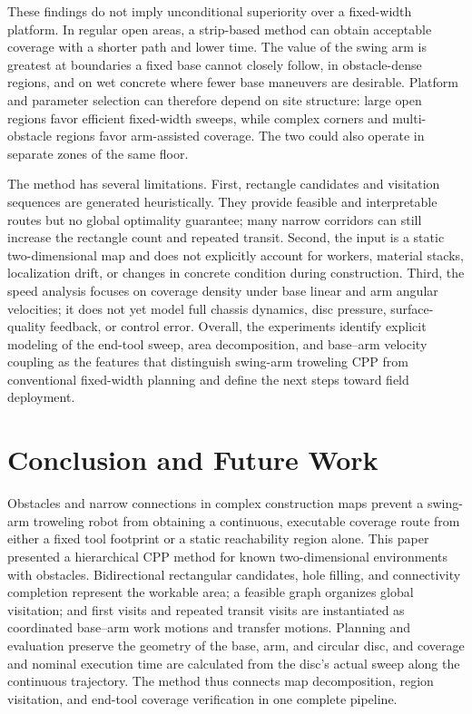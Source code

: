 \documentclass[a4paper,11pt]{article}
\providecommand{\DIFaddtex}[1]{{\protect\color{blue}#1}} %
\providecommand{\DIFaddbegin}{} %
\providecommand{\DIFaddend}{} %
\providecommand{\DIFadd}[1]{\texorpdfstring{\DIFaddtex{#1}}{#1}} %
\begin{document}
These findings do not imply unconditional superiority over a fixed-width platform. In regular open areas, a strip-based method can obtain acceptable coverage with a shorter path and lower time. The value of the swing arm is greatest at boundaries a fixed base cannot closely follow, in obstacle-dense regions, and on wet concrete where fewer base maneuvers are desirable. Platform and parameter selection can therefore depend on site structure: large open regions favor efficient fixed-width sweeps, while complex corners and multi-obstacle regions favor arm-assisted coverage. The two could also operate in separate zones of the same floor.

The method has several limitations. First, rectangle candidates and visitation sequences are generated heuristically. They provide feasible and interpretable routes but no global optimality guarantee; many narrow corridors can still increase the rectangle count and repeated transit. Second, the input is a static two-dimensional map and does not explicitly account for workers, material stacks, localization drift, or changes in concrete condition during construction. Third, the speed analysis focuses on coverage density under base linear and arm angular velocities; it does not yet model full chassis dynamics, disc pressure, surface-quality feedback, or control error. Overall, the experiments identify explicit modeling of the end-tool sweep, area decomposition, and \DIFaddbegin \DIFadd{base--arm }\DIFaddend velocity coupling as the features that distinguish swing-arm troweling CPP from conventional fixed-width planning and define the next steps toward field deployment.

\section{Conclusion and Future Work}
\label{sec:conclusion}

Obstacles and narrow connections in complex construction maps prevent a swing-arm troweling robot from obtaining a continuous, executable coverage route from either a fixed tool footprint or a static reachability region alone. This paper presented a hierarchical CPP method for known two-dimensional environments with obstacles. Bidirectional rectangular candidates, hole filling, and connectivity completion represent the workable area; a feasible graph organizes global visitation; and first visits and repeated transit visits are instantiated as coordinated base--arm work motions and transfer motions. Planning and evaluation preserve the geometry of the base, arm, and circular disc, and coverage and nominal execution time are calculated from the disc's actual sweep along the continuous trajectory. The method thus connects map decomposition, region visitation, and end-tool coverage verification in one complete pipeline.
\end{document}
